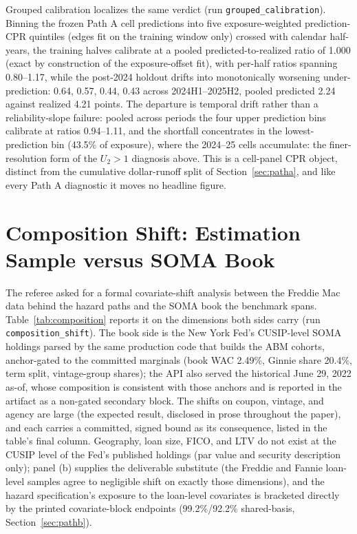 \documentclass[12pt]{article}
\begin{document}
Grouped calibration localizes the same verdict (run \texttt{grouped\_calibration}). Binning the frozen Path A cell predictions into five exposure-weighted prediction-CPR quintiles (edges fit on the training window only) crossed with calendar half-years, the training halves calibrate at a pooled predicted-to-realized ratio of 1.000 (exact by construction of the exposure-offset fit), with per-half ratios spanning 0.80--1.17, while the post-2024 holdout drifts into monotonically worsening under-prediction: 0.64, 0.57, 0.44, 0.43 across 2024H1--2025H2, pooled predicted 2.24 against realized 4.21 points. The departure is temporal drift rather than a reliability-slope failure: pooled across periods the four upper prediction bins calibrate at ratios 0.94--1.11, and the shortfall concentrates in the lowest-prediction bin (43.5\% of exposure), where the 2024--25 cells accumulate: the finer-resolution form of the $U_2 > 1$ diagnosis above. This is a cell-panel CPR object, distinct from the cumulative dollar-runoff split of Section~\ref{sec:patha}, and like every Path A diagnostic it moves no headline figure.

\section{Composition Shift: Estimation Sample versus SOMA Book}\label{app:composition}

The referee asked for a formal covariate-shift analysis between the Freddie Mac data behind the hazard paths and the SOMA book the benchmark spans. Table~\ref{tab:composition} reports it on the dimensions both sides carry (run \texttt{composition\_shift}). The book side is the New York Fed's CUSIP-level SOMA holdings parsed by the same production code that builds the ABM cohorts, anchor-gated to the committed marginals (book WAC 2.49\%, Ginnie share 20.4\%, term split, vintage-group shares); the API also served the historical June 29, 2022 as-of, whose composition is consistent with those anchors and is reported in the artifact as a non-gated secondary block. The shifts on coupon, vintage, and agency are large (the expected result, disclosed in prose throughout the paper), and each carries a committed, signed bound as its consequence, listed in the table's final column. Geography, loan size, FICO, and LTV do not exist at the CUSIP level of the Fed's published holdings (par value and security description only); panel (b) supplies the deliverable substitute (the Freddie and Fannie loan-level samples agree to negligible shift on exactly those dimensions), and the hazard specification's exposure to the loan-level covariates is bracketed directly by the printed covariate-block endpoints (99.2\%/92.2\% shared-basis, Section~\ref{sec:pathb}).
\end{document}
